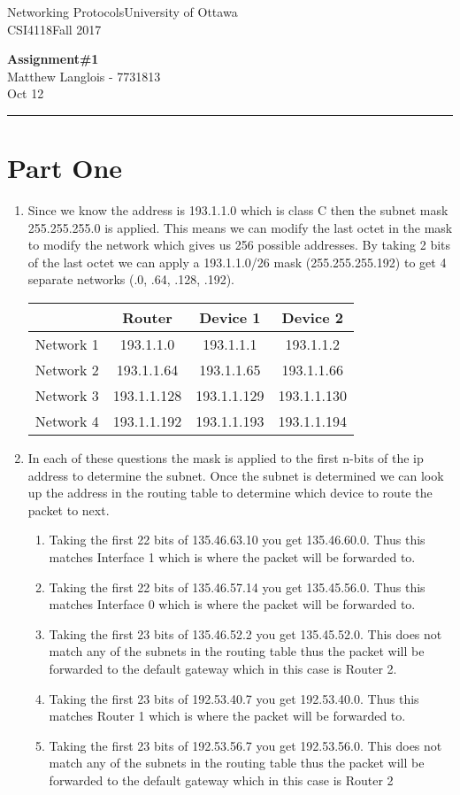 \documentclass[fleqn, 12pt]{article}
\newcommand{\university}{University of Ottawa}
\newcommand{\name}{Matthew Langlois}
\newcommand{\studentNumber}{7731813}
\newcommand{\semester}{Fall 2017}
\newcommand{\assignmentType}{Assignment}
\newcommand{\assignmentNumber}{1}
\newcommand{\dueDate}{Oct 12}
\newcommand{\courseCode}{CSI4118}
\newcommand{\courseTitle}{Networking Protocols}
\newcommand{\essayTitle}{<Title>} %
\newcommand{\essaySubtitle}{<subtitle>} %
\newcommand{\essayAbstract}{} %
\newcommand{\beginassignemnt}{
    \newlength\tindent
    \setlength{\tindent}{\parindent}
    \setlength{\parindent}{0pt}
    
    \thispagestyle{assignment}
    \noindent
    \courseTitle \hfill \university\\
    \courseCode \hfill \semester
    \begin{center}
        \textbf{\assignmentType\text{ }\#\assignmentNumber}\\
        \name \hspace{1pt} - \studentNumber\\
        \dueDate\\
    \end{center}
    \vspace{6pt}
    \hrule
    \vspace{1.5\headsep}
}
\newcommand{\beginessay}{
    \nocite{*}
    
    \pagestyle{frontmatter}
    \pagenumbering{roman}
    
    \begin{center}
        \normalsize 
        \textsc{\university}\\[5cm]
        \LARGE \textbf{\MakeUppercase{\essayTitle}}\\[0.5cm]
        \large \text{ }\essaySubtitle\text{ }\\[10cm] %
        \normalsize
        \textsc{\name}\\
        \textsc{\studentNumber}\\ 
        \textsc{\courseCode}\\
        \textsc{\semester}\\
        \textsc{\dueDate}
    \end{center}
    \thispagestyle{empty}
    
    \newpage
    \tableofcontents
    \newpage
    
    \iftotalfigures
        \addcontentsline{toc}{section}{\listfigurename}
        \listoffigures
    \fi
    \iftotaltables
        \addcontentsline{toc}{section}{\listtablename}
        \listoftables
    \fi
    
    \ifdefempty{\essayAbstract}{}{
        \newpage
        \addcontentsline{toc}{section}{Abstract}
        \begin{abstract}
            \essayAbstract
        \end{abstract}
        
    }
    \label{EndFrontMatter}
    \newpage
    
    \pagenumbering{arabic}
    \pagestyle{body}
}
\begin{document}
\beginassignemnt

\section*{Part One}

\begin{enumerate}
    \item 
        Since we know the address is 193.1.1.0 which is class C then the subnet mask 255.255.255.0 is applied. This means we can modify the last octet in the mask to modify the network which gives us 256 possible addresses. By taking 2 bits of the last octet we can apply a 193.1.1.0/26 mask (255.255.255.192) to get 4 separate networks (.0, .64, .128, .192). 
        
        \begin{tabular}{|c|c|c|c|}
            \hline
             & Router & Device 1 & Device 2 \\\hline
             Network 1 & 193.1.1.0 & 193.1.1.1 & 193.1.1.2\\\hline
             Network 2 & 193.1.1.64 & 193.1.1.65 & 193.1.1.66\\\hline
             Network 3 & 193.1.1.128 & 193.1.1.129 & 193.1.1.130\\\hline
             Network 4 & 193.1.1.192 & 193.1.1.193 & 193.1.1.194\\\hline
        \end{tabular}
    \item 
        In each of these questions the mask is applied to the first n-bits of the ip address to determine the subnet. Once the subnet is determined we can look up the address in the routing table to determine which device to route the packet to next. 
        \begin{enumerate}
            \item 
                Taking the first 22 bits of 135.46.63.10 you get 135.46.60.0. Thus this matches Interface 1 which is where the packet will be forwarded to.
            \item
                Taking the first 22 bits of 135.46.57.14 you get 135.45.56.0. Thus this matches Interface 0 which is where the packet will be forwarded to.
            \item
                Taking the first 23 bits of 135.46.52.2 you get 135.45.52.0. This does not match any of the subnets in the routing table thus the packet will be forwarded to the default gateway which in this case is Router 2.
            \item
                Taking the first 23 bits of 192.53.40.7 you get 192.53.40.0. Thus this matches Router 1 which is where the packet will be forwarded to.
            \item
                Taking the first 23 bits of 192.53.56.7 you get 192.53.56.0. This does not match any of the subnets in the routing table thus the packet will be forwarded to the default gateway which in this case is Router 2
        \end{enumerate}
        

\end{enumerate}
\end{document}
